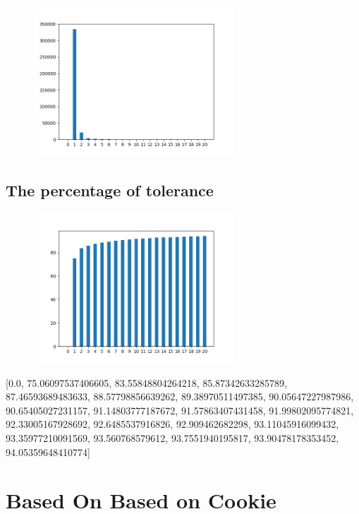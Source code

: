 \documentclass[10pt, conference, compsocconf]{IEEEtran}
\begin{document}
\begin{figure}[H]\centering\includegraphics[width=75mm,scale=0.5]{BasedonClientIDnumberofusersfingerprint}\end{figure}\subsection{The percentage of tolerance}
\begin{figure}[H]\centering\includegraphics[width=75mm,scale=0.5]{BasedonClientIDtolerance}\end{figure}[0.0, 75.06097537406605, 83.55848804264218, 85.87342633285789, 87.46593689483633, 88.57798856639262, 89.38970511497385, 90.05647227987986, 90.65405027231157, 91.14803777187672, 91.57863407431458, 91.99802095774821, 92.33005167928692, 92.6485537916826, 92.909462682298, 93.11045916099432, 93.35977210091569, 93.560768579612, 93.7551940195817, 93.90478178353452, 94.05359648410774]\section{Based On Based on Cookie}
\end{document}
